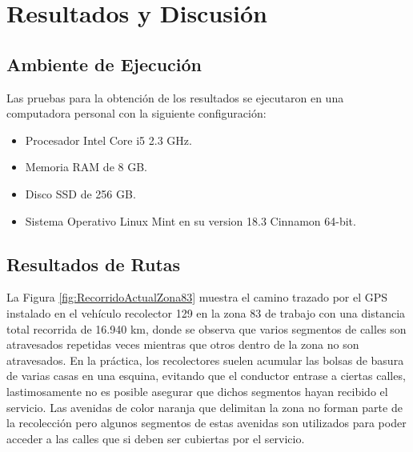 \chapter{Resultados y Discusión}
\label{resultadosdiscusion}
\ifpdf
  \graphicspath{{Chapter7/Chapter7Figs/PNG/}{Chapter7/Chapter7Figs/PDF/}{Chapter7/Chapter7Figs/}}
\else
  \graphicspath{{Chapter7/Chapter7Figs/EPS/}{Chapter7/Chapter7Figs/}}
\fi


\section{Ambiente de Ejecución}
\label{sec:ambiente_ejecucion}

Las pruebas para la obtención de los resultados se ejecutaron en una computadora personal con la siguiente configuración:
\begin{itemize}
   \item Procesador Intel\textcopyright{}  Core\texttrademark{} i5 2.3 GHz.
    \item Memoria RAM de 8 GB. 
    \item Disco SSD de 256 GB.
    \item Sistema Operativo Linux Mint en su version 18.3 Cinnamon 64-bit.
\end{itemize}



\section{Resultados de Rutas}


La Figura \ref{fig:RecorridoActualZona83} muestra el camino trazado por el GPS instalado en el vehículo recolector 129 en la zona 83 de trabajo con una distancia total recorrida de 16.940 km, donde se observa que varios segmentos de calles son atravesados repetidas veces mientras que otros dentro de la zona no son atravesados. En la práctica, los recolectores suelen acumular las bolsas de basura de varias casas en una esquina, evitando que el conductor entrase a ciertas calles, lastimosamente no es posible asegurar que dichos segmentos hayan recibido el servicio. Las avenidas de color naranja que delimitan la zona no forman parte de la recolección pero algunos segmentos de estas avenidas son utilizados para poder acceder a las calles que si deben ser cubiertas por el servicio.

